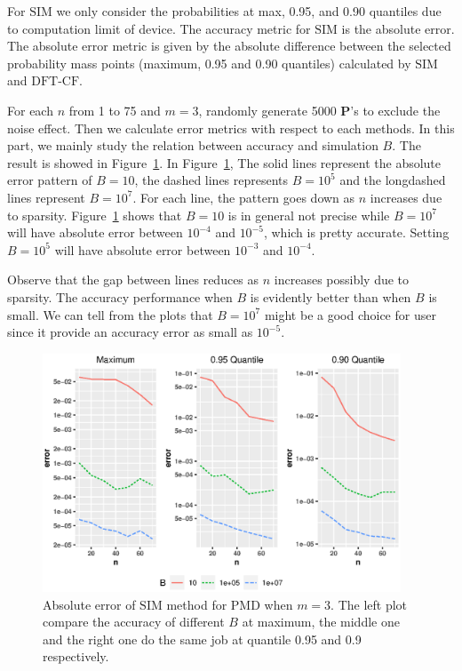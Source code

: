 \documentclass[12pt]{article}
\newcommand{\Pmat}{\mathbf{P}}
\newcommand{\PMD}{\textrm{PMD}}
\newcommand{\SIM}{{\textrm{SIM}}}
\newcommand{\dft}{{\textrm{DFT-CF}}}
\begin{document}
For $\SIM$ we only consider the probabilities at max, 0.95, and 0.90 quantiles due to computation limit of device. The accuracy metric for $\SIM$ is the absolute error. The absolute error metric is given by the absolute difference between the selected probability mass points (maximum, 0.95 and 0.90 quantiles) calculated by $\SIM$ and $\dft$.

For each $n$ from 1 to 75 and $m=3$, randomly generate 5000 $\Pmat$'s to exclude the noise effect. Then we calculate error metrics with respect to each methods. In this part, we mainly study the relation between accuracy and simulation $B$. The result is showed in Figure~\ref{fig:accuracy.sim}. In Figure~\ref{fig:accuracy.sim}, The solid lines represent the absolute error pattern of $B=10$, the dashed lines represents $B=10^5$ and the longdashed lines represent $B=10^7$. For each line, the pattern goes down as $n$ increases due to sparsity. Figure~\ref{fig:accuracy.sim} shows that $B=10$ is in general not precise while $B=10^7$ will have absolute error between $10^{-4}$ and $10^{-5}$, which is pretty accurate. Setting $B=10^5$ will have absolute error between $10^{-3}$ and $10^{-4}$. 

Observe that the gap between lines reduces as $n$ increases possibly due to sparsity. The accuracy performance when $B$ is evidently better than when $B$ is small. We can tell from the plots that $B=10^7$ might be a good choice for user since it provide an accuracy error as small as $10^{-5}$.

\begin{figure}%
\begin{center}
	\includegraphics[width=0.95\textwidth]{figures/sim.eps}
	\caption{Absolute error of $\SIM$ method for $\PMD$ when $m=3$. The left plot compare the accuracy of different $B$ at maximum, the middle one and the right one do the same job at quantile 0.95 and 0.9 respectively. }
	\label{fig:accuracy.sim}
\end{center}
\end{figure}
\end{document}

